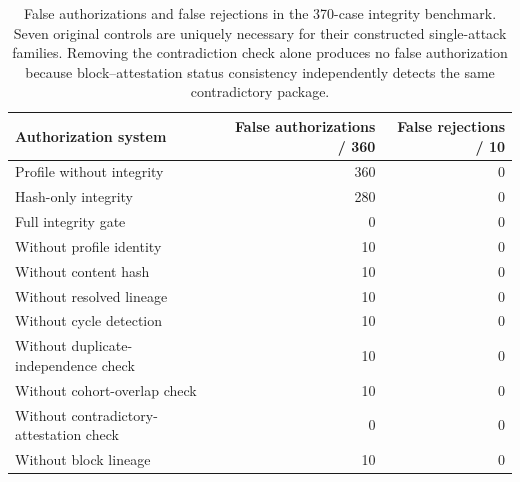 \begin{table}[!htbp]
\centering
\caption{False authorizations and false rejections in the 370-case integrity benchmark. Seven original controls are uniquely necessary for their constructed single-attack families. Removing the contradiction check alone produces no false authorization because block--attestation status consistency independently detects the same contradictory package.}
\label{tab:integrity-ablation-v2}
\footnotesize
\renewcommand{\arraystretch}{1.05}
\begin{tabularx}{\textwidth}{@{}Y r r@{}}
\toprule
Authorization system & False authorizations / 360 & False rejections / 10 \\
\midrule
Profile without integrity & 360 & 0 \\
Hash-only integrity & 280 & 0 \\
Full integrity gate & 0 & 0 \\
Without profile identity & 10 & 0 \\
Without content hash & 10 & 0 \\
Without resolved lineage & 10 & 0 \\
Without cycle detection & 10 & 0 \\
Without duplicate-independence check & 10 & 0 \\
Without cohort-overlap check & 10 & 0 \\
Without contradictory-attestation check & 0 & 0 \\
Without block lineage & 10 & 0 \\
\bottomrule
\end{tabularx}
\end{table}
